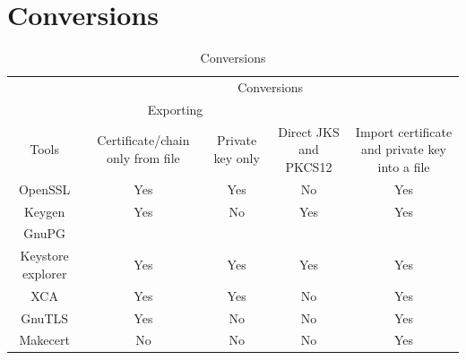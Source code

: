 \documentclass[10pt, a4paper]{report}
\begin{document}
\section{Conversions}

\begin{table}[h!]
\centering
\caption{Conversions}
\label{my-label}
\begin{adjustbox}{max width=\textwidth}
\begin{tabular}{|c|c|c|c|c|}
\hline
                        & \multicolumn{4}{c|}{Conversions}                                                                                                                                            \\ \cline{2-5} 
                        & \multicolumn{2}{c|}{Exporting}                                 &                                         &                                                                  \\ \cline{2-3}
\multirow{-3}{*}{Tools} & Certificate/chain only from file & Private key only            & \multirow{-2}{*}{Direct JKS and PKCS12} & \multirow{-2}{*}{Import certificate and private key into a file} \\ \hline
OpenSSL                 & \cellcolor[HTML]{34FF34}Yes      & \cellcolor[HTML]{34FF34}Yes & \cellcolor[HTML]{FE0000}No              & \cellcolor[HTML]{34FF34}Yes                                      \\ \hline
Keygen                  & \cellcolor[HTML]{34FF34}Yes      & \cellcolor[HTML]{FE0000}No  & \cellcolor[HTML]{34FF34}Yes             & \cellcolor[HTML]{34FF34}Yes                                      \\ \hline
GnuPG                   &                                  &                             &                                         &                                                                  \\ \hline
Keystore explorer       & \cellcolor[HTML]{34FF34}Yes      & \cellcolor[HTML]{34FF34}Yes & \cellcolor[HTML]{34FF34}Yes             & \cellcolor[HTML]{34FF34}Yes                                      \\ \hline
XCA                     & \cellcolor[HTML]{34FF34}Yes      & \cellcolor[HTML]{34FF34}Yes & \cellcolor[HTML]{FE0000}No              & \cellcolor[HTML]{34FF34}Yes                                      \\ \hline
GnuTLS                  & \cellcolor[HTML]{34FF34}Yes      & \cellcolor[HTML]{FE0000}No  & \cellcolor[HTML]{FE0000}No              & \cellcolor[HTML]{34FF34}Yes                                      \\ \hline
Makecert		& \cellcolor[HTML]{FE0000}No	   & \cellcolor[HTML]{FE0000}No  & \cellcolor[HTML]{FE0000}No		   & \cellcolor[HTML]{34FF34}Yes				      \\ \hline
\end{tabular}
\end{adjustbox}
\end{table}
\end{document}
